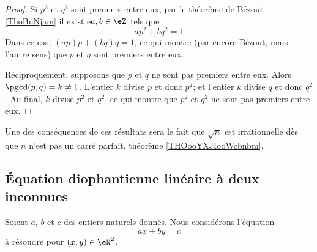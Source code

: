 \begin{proof}
    Si \( p^2\) et \( q^2\) sont premiers entre eux, par le théorème de Bézout \ref{ThoBuNjam} il exist e\( a,b\in \eZ\) tels que
    \begin{equation}
        ap^2+bq^2=1
    \end{equation}
    Dans ce cas, \( (ap)p+(bq)q=1\), ce qui montre (par encore Bézout, mais l'autre sens) que \( p\) et \( q\) sont premiers entre eux.

    Réciproquement, supposons que \( p\) et \( q\) ne sont pas premiers entre eux. Alors \( \pgcd(p,q)=k\neq 1\). L'entier \( k\) divise \( p\) et donc \( p^2\); et l'entier \( k\) divise \( q\) et donc \( q^2\). Au final, \( k\) divise \( p^2\) et \( q^2\), ce qui montre que \( p^2\) et \( q^2\) ne sont pas premiers entre eux.
\end{proof}

Une des conséquences de ces résultats sera le fait que \( \sqrt{n}\) est irrationnelle dès que \( n\) n'est pas un carré parfait, théorème \ref{THOooYXJIooWcbnbm}.

\subsection{Équation diophantienne linéaire à deux inconnues}
\label{subsecZVKNooXNjPSf}



Soient \( a\), \( b\) et \( c\) des entiers naturels donnés. Nous considérons l'équation
\begin{equation}        \label{EqTOVSooJbxlIq}
    ax+by=c
\end{equation}
à résoudre\cite{PAYUooYVuNAB} pour \( (x,y)\in \eN^2\).

